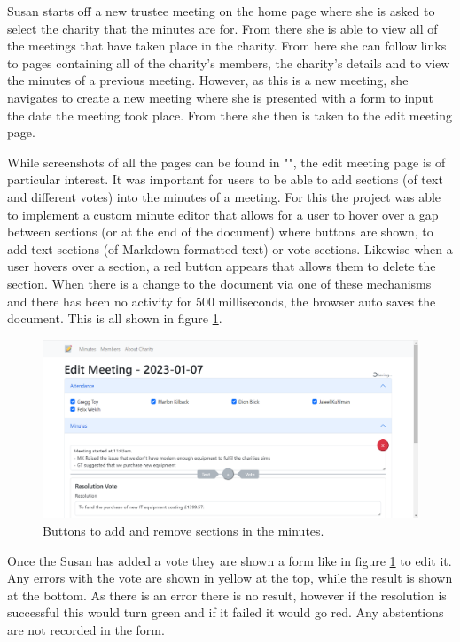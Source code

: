 \documentclass{UoYCSproject}
\begin{document}
Susan starts off a new trustee meeting on the home page where she is asked to select the charity that the minutes are for. From there she is able to view all of the meetings that have taken place in the charity. From here she can follow links to pages containing all of the charity's members, the charity's details and to view the minutes of a previous meeting. However, as this is a new meeting, she navigates to create a new meeting where she is presented with a form to input the date the meeting took place. From there she then is taken to the edit meeting page.

While screenshots of all the pages can be found in "", the edit meeting page is of particular interest. It was important for users to be able to add sections (of text and different votes) into the minutes of a meeting. For this the project was able to implement a custom minute editor that allows for a user to hover over a gap between sections (or at the end of the document) where buttons are shown, to add text sections (of Markdown formatted text) or vote sections. Likewise when a user hovers over a section, a red button appears that allows them to delete the section. When there is a change to the document via one of these mechanisms and there has been no activity for 500 milliseconds, the browser auto saves the document. This is all shown in figure \ref{fig:edit_minutes_buttons}.

\begin{figure}[htb]
\begin{center}
\includegraphics[width=\textwidth]{"./assets/apendix/frontend-screenshots/Minutes Edit - Buttons.png"}
\end{center}
\caption{Buttons to add and remove sections in the minutes.}
\label{fig:edit_minutes_buttons}
\end{figure}

Once the Susan has added a vote they are shown a form like in figure \ref{fig:edit_minutes_buttons} to edit it. Any errors with the vote are shown in yellow at the top, while the result is shown at the bottom. As there is an error there is no result, however if the resolution is successful this would turn green and if it failed it would go red. Any abstentions are not recorded in the form.
\end{document}
